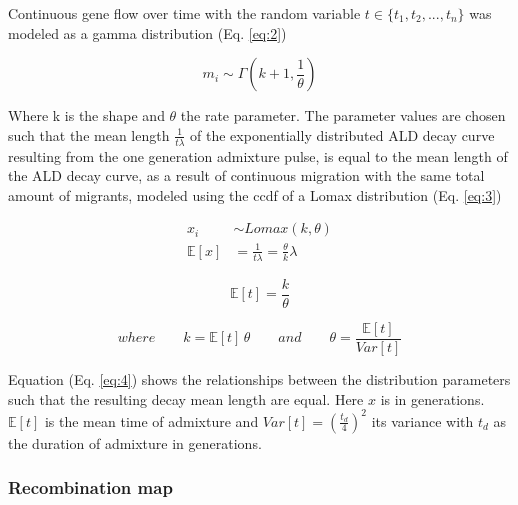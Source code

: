\documentclass[]{article}
\begin{document}
Continuous gene flow over time with the random variable $t \in \{t_1,t_2,...,t_n\}$ was modeled as a gamma distribution (Eq.
\ref{eq:2})

\begin{equation}
\label{eq:2}
m_i \sim \Gamma(k+1,\frac{1}{\theta})
\end{equation}

Where k is the shape and \(\theta\) the rate parameter. The parameter
values are chosen such that the mean length \(\frac{1}{t\lambda}\) of the
exponentially distributed ALD decay curve resulting from the one
generation admixture pulse, is equal to the mean length of the ALD decay
curve, as a result of continuous migration with the same total amount of
migrants, modeled using the ccdf of a Lomax distribution (Eq. \ref{eq:3})

\begin{equation}
\begin{split}
\label{eq:3}
x_i &\sim Lomax(k,\theta) \\
\mathbb{E}[x] &= \frac{1}{t\lambda} = \frac{\theta}{k}\lambda
\end{split}
\end{equation}

\begin{equation}
\label{eq:4}
\mathbb{E}[t]=\frac{k}{\theta}
\end{equation}

\begin{equation*}
\nonumber
where \qquad k=\mathbb{E}[t] \, \theta \qquad and \qquad \theta=\frac{\mathbb{E}[t]}{Var[t]}
\end{equation*}

Equation (Eq. \ref{eq:4}) shows the relationships between the
distribution parameters such that the resulting decay mean length are
equal. Here \(x\) is in generations. $\mathbb{E}[t]$ is the mean time of admixture and $Var[t]=(\frac{t_d}{4})^2$ its variance with $t_d$ as the duration of admixture in generations.

\subsubsection{Recombination map}\label{recombination map}
\end{document}
